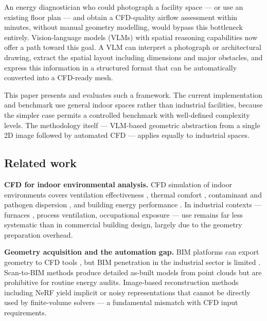 \documentclass[preprint,12pt,number]{elsarticle}
\begin{document}
An energy diagnostician who could photograph a facility space --- or use an existing floor plan --- and obtain a CFD-quality airflow assessment within minutes, without manual geometry modelling, would bypass this bottleneck entirely. Vision-language models (VLMs) with spatial reasoning capabilities \cite{openai.etal2023GPT4Technical,geminiteam.etal2023GeminiFamily,chen.etal2024SpatialVLMEndowing,hong.etal20233DLLMInjecting} now offer a path toward this goal. A VLM can interpret a photograph or architectural drawing, extract the spatial layout including dimensions and major obstacles, and express this information in a structured format that can be automatically converted into a CFD-ready mesh.

This paper presents and evaluates such a framework. The current implementation and benchmark use general indoor spaces rather than industrial facilities, because the simpler case permits a controlled benchmark with well-defined complexity levels. The methodology itself --- VLM-based geometric abstraction from a single 2D image followed by automated CFD --- applies equally to industrial spaces.

\subsection{Related work}
\label{sec:related-work}


\textbf{CFD for indoor environmental analysis.} CFD simulation of indoor environments covers ventilation effectiveness \cite{kosutova.etal2019CrossventilationGeneric,liu.etal2019ReviewCFD}, thermal comfort \cite{chen.etal2021UnsteadystateCFD}, contaminant and pathogen dispersion \cite{vuorinen.etal2020ModellingAerosol,liu.etal2021SimulationbasedStudy,srivastava.etal2021EffectiveVentilation}, and building energy performance \cite{brozovsky.etal2022AssessingImpact,ren.cao2019DevelopmentApplication}. In industrial contexts --- furnaces \cite{zhao.etal2021IndustrialReheating}, process ventilation, occupational exposure --- use remains far less systematic than in commercial building design, largely due to the geometry preparation overhead.

\textbf{Geometry acquisition and the automation gap.} BIM platforms can export geometry to CFD tools \cite{utkucu.sozer2020InteroperabilityData,hou.etal2022PredictionOptimization}, but BIM penetration in the industrial sector is limited \cite{gourlis.kovacic2017BuildingInformation}. Scan-to-BIM methods \cite{rocha.etal2020ScantoBIMMethodology,wang.etal2019ApplicationOriented} produce detailed as-built models from point clouds but are prohibitive for routine energy audits. Image-based reconstruction methods including NeRF \cite{mildenhall.etal2020NeRFRepresenting} yield implicit or noisy representations that cannot be directly used by finite-volume solvers --- a fundamental mismatch with CFD input requirements.
\end{document}
